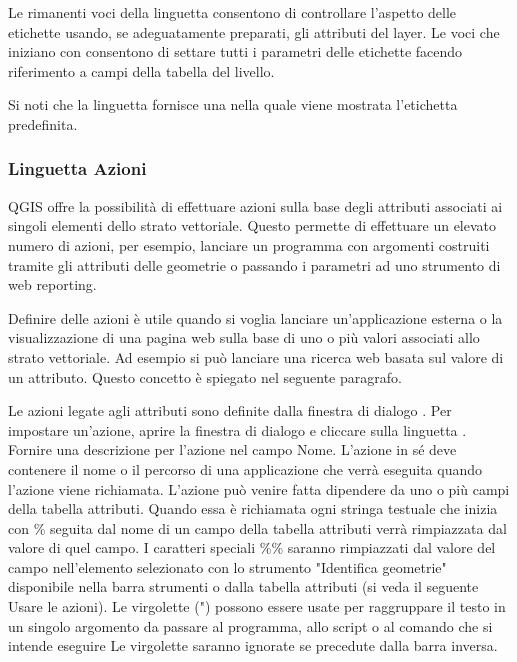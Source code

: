 Le rimanenti voci della linguetta  consentono di controllare
l'aspetto delle etichette usando, se adeguatamente preparati, gli attributi
del layer. Le voci che iniziano con  consentono di settare
tutti i parametri delle etichette facendo riferimento a campi della tabella
del livello.

Si noti che la linguetta  fornisce una 
nella quale viene mostrata l'etichetta predefinita.

\subsubsection{Linguetta Azioni}\label{label_actions}

QGIS offre la possibilità di effettuare azioni sulla base degli
attributi associati ai singoli elementi dello strato vettoriale.
Questo permette di effettuare un elevato numero di azioni, per esempio,
lanciare un programma con argomenti costruiti tramite gli attributi
delle geometrie o passando i parametri ad uno strumento di web reporting.

Definire delle azioni è utile quando si voglia lanciare un'applicazione
esterna o la visualizzazione di una pagina web sulla base di uno o più valori
associati allo strato vettoriale. Ad esempio si può lanciare una ricerca web
basata sul valore di un attributo. Questo concetto è spiegato nel seguente
paragrafo.


Le azioni legate agli attributi sono definite dalla finestra di dialogo
. Per impostare un'azione, aprire la finestra
di dialogo  e cliccare sulla linguetta
. Fornire una descrizione per l'azione nel campo Nome. L'azione in
sé deve contenere il nome o il percorso di una applicazione che verrà eseguita quando
l'azione viene richiamata. L'azione può venire fatta dipendere da uno o più campi della tabella
attributi. Quando essa è richiamata ogni stringa testuale che inizia con  \%
seguita dal nome di un campo della tabella attributi verrà rimpiazzata dal
valore di quel campo. I caratteri speciali  \%\% \index{\%\%}saranno
rimpiazzati dal valore del campo nell'elemento selezionato con lo strumento
"Identifica geometrie" disponibile nella barra strumenti o dalla tabella attributi (si veda il seguente Usare le azioni). Le virgolette
(") possono essere usate per raggruppare il testo in un singolo argomento da
passare al programma, allo script o al comando che si intende eseguire Le
virgolette saranno ignorate se precedute dalla barra inversa.

